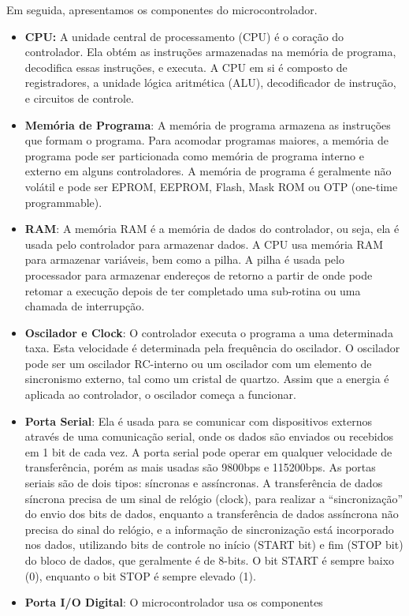 Em seguida, apresentamos os componentes do microcontrolador.
\begin{itemize}
\item \textbf{CPU:} A unidade central de processamento (CPU) é o coração
do controlador. Ela obtém as instruções armazenadas na memória de
programa, decodifica essas instruções, e executa. A CPU em si é composto
de registradores, a unidade lógica aritmética (ALU), decodificador
de instrução, e circuitos de controle.
\item \textbf{Memória de Programa}: A memória de programa armazena as instruções
que formam o programa. Para acomodar programas maiores, a memória
de programa pode ser particionada como memória de programa interno
e externo em alguns controladores. A memória de programa é geralmente
não volátil e pode ser EPROM, EEPROM, Flash, Mask ROM ou OTP (one-time
programmable).
\item \textbf{RAM}: A memória RAM é a memória de dados do controlador, ou
seja, ela é usada pelo controlador para armazenar dados. A CPU usa
memória RAM para armazenar variáveis, bem como a pilha. A pilha é
usada pelo processador para armazenar endereços de retorno a partir
de onde pode retomar a execução depois de ter completado uma sub-rotina
ou uma chamada de interrupção.
\item \textbf{Oscilador e Clock}: O controlador executa o programa a uma
determinada taxa. Esta velocidade é determinada pela frequência do
oscilador. O oscilador pode ser um oscilador RC-interno ou um oscilador
com um elemento de sincronismo externo, tal como um cristal de quartzo.
Assim que a energia é aplicada ao controlador, o oscilador começa
a funcionar.
\item \textbf{Porta Serial}: Ela é usada para se comunicar com dispositivos
externos através de uma comunicação serial, onde os dados são enviados
ou recebidos em 1 bit de cada vez. A porta serial pode operar em qualquer
velocidade de transferência, porém as mais usadas são 9800bps e 115200bps.
As portas seriais são de dois tipos: síncronas e assíncronas. A transferência
de dados síncrona precisa de um sinal de relógio (clock), para realizar
a ``sincronização'' do envio dos bits de dados, enquanto a transferência
de dados assíncrona não precisa do sinal do relógio, e a informação
de sincronização está incorporado nos dados, utilizando bits de controle
no início (START bit) e fim (STOP bit) do bloco de dados, que geralmente
é de 8-bits. O bit START é sempre baixo (0), enquanto o bit STOP é
sempre elevado (1).
\item \textbf{Porta I/O Digital}: O microcontrolador usa os componentes

\end{itemize}
